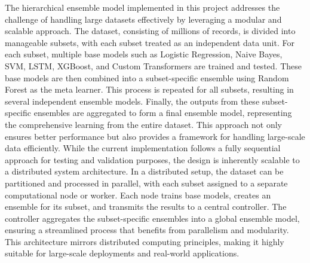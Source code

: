 \noindent
The hierarchical ensemble model implemented in this project addresses the challenge of handling large datasets effectively by leveraging a modular and scalable approach. The dataset, consisting of millions of records, is divided into manageable subsets, with each subset treated as an independent data unit. For each subset, multiple base models such as Logistic Regression, Naive Bayes, SVM, LSTM, XGBoost, and Custom Transformers are trained and tested. These base models are then combined into a subset-specific ensemble using Random Forest as the meta learner. This process is repeated for all subsets, resulting in several independent ensemble models. Finally, the outputs from these subset-specific ensembles are aggregated to form a final ensemble model, representing the comprehensive learning from the entire dataset. This approach not only ensures better performance but also provides a framework for handling large-scale data efficiently. While the current implementation follows a fully sequential approach for testing and validation purposes, the design is inherently scalable to a distributed system architecture. In a distributed setup, the dataset can be partitioned and processed in parallel, with each subset assigned to a separate computational node or worker. Each node trains base models, creates an ensemble for its subset, and transmits the results to a central controller. The controller aggregates the subset-specific ensembles into a global ensemble model, ensuring a streamlined process that benefits from parallelism and modularity. This architecture mirrors distributed computing principles, making it highly suitable for large-scale deployments and real-world applications. 

\vspace{1em}

